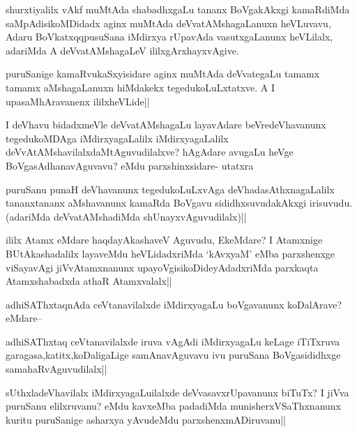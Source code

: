 \begin{artha}
shurxtiyalilx vAkf muMtAda shabadhxgaLu tananx BoVgakAkxgi kamaRdiMda saMpAdisikoMDidadx aginx muMtAda deVvatAMshagaLanuxn heVLuvavu, Adaru BoVkatxqqpusuSana iMdirxya rUpavAda vasutxgaLanunx heVLilalx, adariMda A deVvatAMshagaLeV ililxgArxhayxvAgive.
\end{artha}

\begin{artha}
puruSanige kamaRvukaSxyisidare aginx muMtAda deVvategaLu tamamx tamamx aMshagaLanuxn hiMdakekx tegedukoLuLxtatxve. A I upasaMhAravanenx ililxheVLide||
\end{artha}

\begin{artha}
I deVhavu bidadxmeVle deVvatAMshagaLu layavAdare beVredeVhavanunx tegedukoMDAga iMdirxyagaLalilx iMdirxyagaLalilx deVvAtAMshavilalxdaMtAguvudilalxve? hAgAdare avugaLu heVge BoVgasAdhanavAguvavu? eMdu parxshinxsidare- utatxra 
\end{artha}

\begin{artha}
puruSanu punaH deVhavanunx tegedukoLuLxvAga deVhadasAthxnagaLalilx tananxtananx aMshavanunx kamaRda BoVgavu sididhxsuvudakAkxgi irisuvudu.(adariMda deVvatAMshadiMda shUnayxvAguvudilalx)||
\end{artha}


\begin{artha}
ililx Atamx eMdare haqdayAkashaveV Aguvudu, EkeMdare? I Atamxnige BUtAkashadalilx layaveMdu heVLidadxriMda `kAvxyaM' eMba parxshenxge viSayavAgi jiVvAtamxnanunx upayoVgisikoDideyAdadxriMda parxkaqta Atamxshabadxda athaR Atamxvalalx||
\end{artha}

\begin{artha}
adhiSAThxtaqnAda ceVtanavilalxde iMdirxyagaLu boVgavanunx koDalArave? eMdare--
\end{artha}

\begin{artha}
adhiSAThxtaq ceVtanavilalxde iruva vAgAdi iMdirxyagaLu keLage iTiTxruva garagasa,katitx,koDaligaLige samAnavAguvavu  ivu puruSana BoVgasididhxge samahaRvAguvudilalx||
\end{artha}


\begin{artha}
sUthxladeVhavilalx iMdirxyagaLuilalxde deVvasavxrUpavanunx biTuTx? I jiVva puruSanu elilxruvanu? eMdu kavxeMba padadiMda munisherxVSaThxnanunx kuritu puruSanige asharxya yAvudeMdu parxshenxmADiruvanu||
\end{artha}

